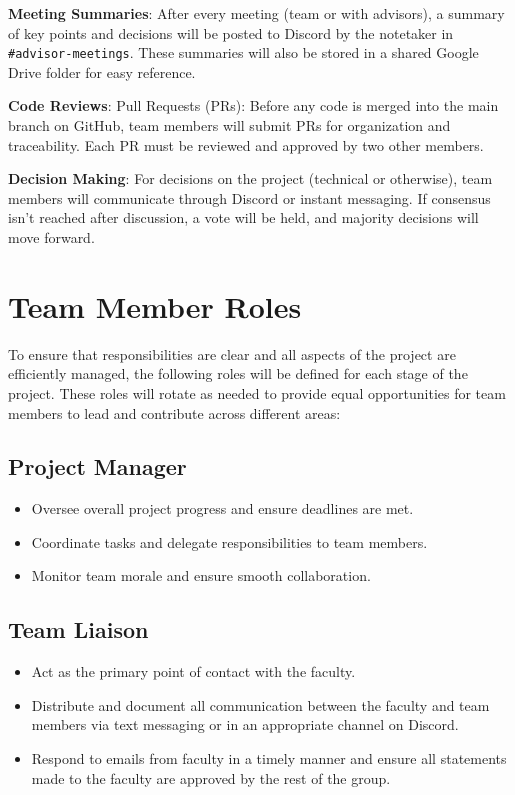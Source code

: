 \documentclass{article}
\begin{document}
\textbf{Meeting Summaries}:
After every meeting (team or with advisors), a summary of key points and decisions will be posted to Discord by the notetaker in \texttt{\#advisor-meetings}. These summaries will also be stored in a shared Google Drive folder for easy reference.

\textbf{Code Reviews}:
Pull Requests (PRs): Before any code is merged into the main branch on GitHub, team members will submit PRs for organization and traceability. Each PR must be reviewed and approved by two other members.

\textbf{Decision Making}:
For decisions on the project (technical or otherwise), team members will communicate through Discord or instant messaging. If consensus isn’t reached after discussion, a vote will be held, and majority decisions will move forward.

\section{Team Member Roles}
To ensure that responsibilities are clear and all aspects of the project are efficiently managed, the following roles will be defined for each stage of the project. These roles will rotate as needed to provide equal opportunities for team members to lead and contribute across different areas:

\subsection{Project Manager} 
  \begin{itemize}
    \item Oversee overall project progress and ensure deadlines are met.
    \item Coordinate tasks and delegate responsibilities to team members.
    \item Monitor team morale and ensure smooth collaboration.
  \end{itemize}

\subsection{Team Liaison}
  \begin{itemize}
    \item Act as the primary point of contact with the faculty.
    \item Distribute and document all communication between the faculty and team members via text messaging or in an appropriate channel on Discord.
    \item Respond to emails from faculty in a timely manner and ensure all statements made to the faculty are approved by the rest of the group.
  \end{itemize}
\end{document}
